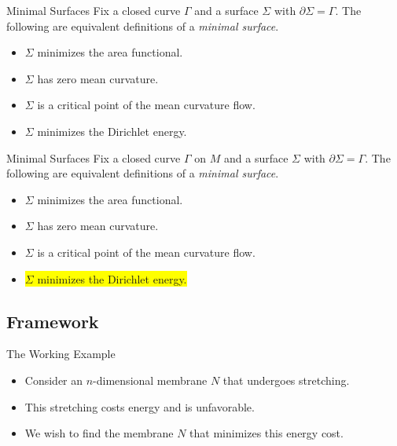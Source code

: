 \documentclass[usenames,dvipsnames]{beamer}
\theoremstyle{definition}
\theoremstyle{theorem}
\begin{document}
        \begin{frame}{Minimal Surfaces}
             Fix a closed curve $\Gamma$ and a surface $\Sigma$ with $\partial \Sigma = \Gamma$. The following are equivalent definitions of a \emph{minimal surface}.
            \begin{itemize}
                \item $\Sigma$ minimizes the area functional.
                \item $\Sigma$ has zero mean curvature.
                \item $\Sigma$ is a critical point of the mean curvature flow.
                \item $\Sigma$ minimizes the Dirichlet energy.
            \end{itemize}
        \end{frame}
        
        \begin{frame}{Minimal Surfaces}
             Fix a closed curve $\Gamma$ on $M$ and a surface $\Sigma$ with $\partial \Sigma = \Gamma$. The following are equivalent definitions of a \emph{minimal surface}.
            \begin{itemize}
                \item $\Sigma$ minimizes the area functional.
                \item $\Sigma$ has zero mean curvature.
                \item $\Sigma$ is a critical point of the mean curvature flow.
                \item \colorbox<1>{yellow}{$\Sigma$ minimizes the Dirichlet energy.}
            \end{itemize}
        \end{frame}
    
        
    \subsection{Framework}
    
    \begin{frame}{The Working Example}
    \begin{itemize}
        \item Consider an $n$-dimensional membrane $N$ that undergoes stretching. 
        \item This stretching costs energy and is unfavorable. 
        \item We wish to find the membrane $N$ that minimizes this energy cost.
    \end{itemize}
    \end{frame}
    
\end{document}
